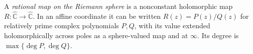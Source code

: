 
A \emph{rational map on the Riemann sphere} is a nonconstant holomorphic map $R:\widehat{\mathbb C}\to\widehat{\mathbb C}$. In an affine coordinate it can be written $R(z)=P(z)/Q(z)$ for relatively prime complex polynomials $P,Q$, with its value extended holomorphically across poles as a sphere-valued map and at $\infty$. Its degree is $\max\{\deg P,\deg Q\}$.
